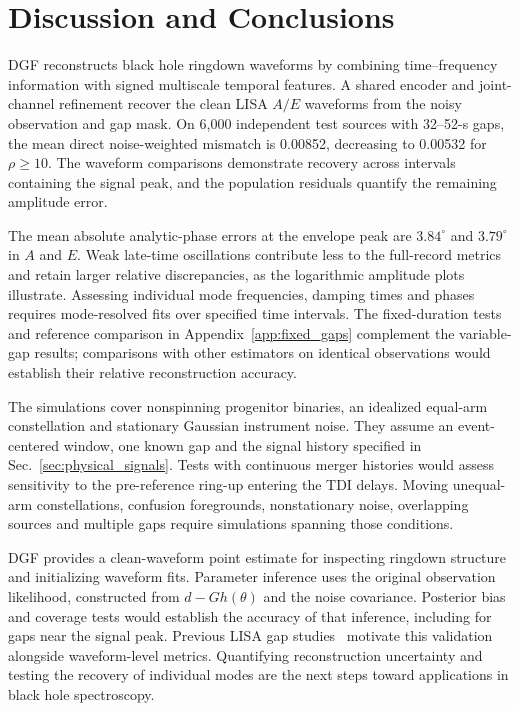\documentclass[10pt,prd,aps,a4paper,twocolumn,superscriptaddress,nofootinbib,floatfix]{revtex4-2}
\begin{document}
\section{Discussion and Conclusions}\label{sec:discussion}
DGF reconstructs black hole ringdown waveforms by combining time--frequency information with signed multiscale temporal features. A shared encoder and joint-channel refinement recover the clean LISA $A/E$ waveforms from the noisy observation and gap mask. On 6,000 independent test sources with 32--52-s gaps, the mean direct noise-weighted mismatch is 0.00852, decreasing to 0.00532 for $\rho\ge10$. The waveform comparisons demonstrate recovery across intervals containing the signal peak, and the population residuals quantify the remaining amplitude error.

The mean absolute analytic-phase errors at the envelope peak are $3.84^\circ$ and $3.79^\circ$ in $A$ and $E$. Weak late-time oscillations contribute less to the full-record metrics and retain larger relative discrepancies, as the logarithmic amplitude plots illustrate. Assessing individual mode frequencies, damping times and phases requires mode-resolved fits over specified time intervals. The fixed-duration tests and reference comparison in Appendix~\ref{app:fixed_gaps} complement the variable-gap results; comparisons with other estimators on identical observations would establish their relative reconstruction accuracy.

The simulations cover nonspinning progenitor binaries, an idealized equal-arm constellation and stationary Gaussian instrument noise. They assume an event-centered window, one known gap and the signal history specified in Sec.~\ref{sec:physical_signals}. Tests with continuous merger histories would assess sensitivity to the pre-reference ring-up entering the TDI delays. Moving unequal-arm constellations, confusion foregrounds, nonstationary noise, overlapping sources and multiple gaps require simulations spanning those conditions.

DGF provides a clean-waveform point estimate for inspecting ringdown structure and initializing waveform fits. Parameter inference uses the original observation likelihood, constructed from $d-Gh(\theta)$ and the noise covariance. Posterior bias and coverage tests would establish the accuracy of that inference, including for gaps near the signal peak. Previous LISA gap studies~\cite{Baghi2019,Mao:2025cae} motivate this validation alongside waveform-level metrics. Quantifying reconstruction uncertainty and testing the recovery of individual modes are the next steps toward applications in black hole spectroscopy.
\end{document}
